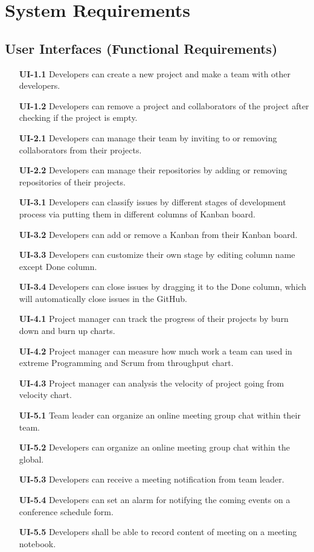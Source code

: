 \documentclass[12pt,a4paper]{report}
\begin{document}
\section{System Requirements}
	\subsection{User Interfaces (Functional Requirements)}
		\begin{enumerate}
			\item[\textbf{UI-1.1}] Developers can create a new project and make a team with other developers.
			\item[\textbf{UI-1.2}] Developers can remove a project and collaborators of the project after checking if the project is empty.
			\item[\textbf{UI-2.1}] Developers can manage their team by inviting to or removing collaborators from their projects.
			\item[\textbf{UI-2.2}] Developers can manage their repositories by adding or removing repositories of their projects.
			\item[\textbf{UI-3.1}] Developers can classify issues by different stages of development process via putting them in different columns of Kanban board. 
			\item[\textbf{UI-3.2}] Developers can add or remove a Kanban from their Kanban board.
			\item[\textbf{UI-3.3}] Developers can customize their own stage by editing column name except Done column.
			\item[\textbf{UI-3.4}]	Developers can close issues by dragging it to the Done column, which will automatically close issues in the GitHub. 
			\item[\textbf{UI-4.1}] Project manager can track the progress of their projects by burn down and burn up charts.
			\item[\textbf{UI-4.2}] Project manager can measure how much work a team can used in extreme Programming and Scrum from throughput chart.
			\item[\textbf{UI-4.3}] Project manager can analysis the velocity of project going from velocity chart.
			\item[\textbf{UI-5.1}] Team leader can organize an online meeting group chat within their team.
			\item[\textbf{UI-5.2}] Developers can organize an online meeting group chat within the global.
			\item[\textbf{UI-5.3}] Developers can receive a meeting notification from team leader.
			\item[\textbf{UI-5.4}] Developers can set an alarm for notifying the coming events on a conference schedule form.
			\item[\textbf{UI-5.5}] Developers shall be able to record content of meeting on a meeting notebook.
		\end{enumerate}
\end{document}
